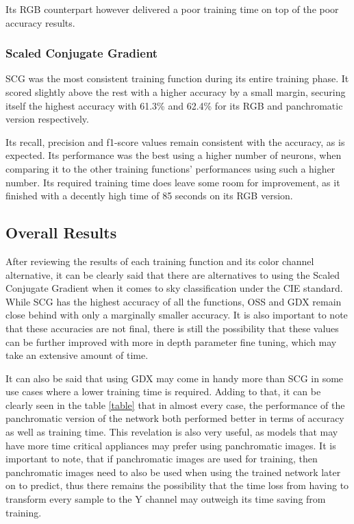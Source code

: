 Its RGB counterpart however delivered a poor training time on top of the poor accuracy results.

\subsubsection{Scaled Conjugate Gradient}
SCG was the most consistent training function during its entire training phase. It scored slightly above the rest with a higher accuracy by a small margin, securing itself the highest accuracy with 61.3\% and 62.4\% for its RGB and panchromatic version respectively.

Its recall, precision and f1-score values remain consistent with the accuracy, as is expected. Its performance was the best using a higher number of neurons, when comparing it to the other training functions' performances using such a higher number. Its required training time does leave some room for improvement, as it finished with a decently high time of 85 seconds on its RGB version.


\subsection{Overall Results}
After reviewing the results of each training function and its color channel alternative, it can be clearly said that there are alternatives to using the Scaled Conjugate Gradient when it comes to sky classification under the CIE standard. While SCG has the highest accuracy of all the functions, OSS and GDX remain close behind with only a marginally smaller accuracy. It is also important to note that these accuracies are not final, there is still the possibility that these values can be further improved with more in depth parameter fine tuning, which may take an extensive amount of time. 

It can also be said that using GDX may come in handy more than SCG in some use cases where a lower training time is required. Adding to that, it can be clearly seen in the table \ref{table} that in almost every case, the performance of the panchromatic version of the network both performed better in terms of accuracy as well as training time. This revelation is also very useful, as models that may have more time critical appliances may prefer using panchromatic images. It is important to note, that if panchromatic images are used for training, then panchromatic images need to also be used when using the trained network later on to predict, thus there remains the possibility that the time loss from having to transform every sample to the Y channel may outweigh its time saving from training.

